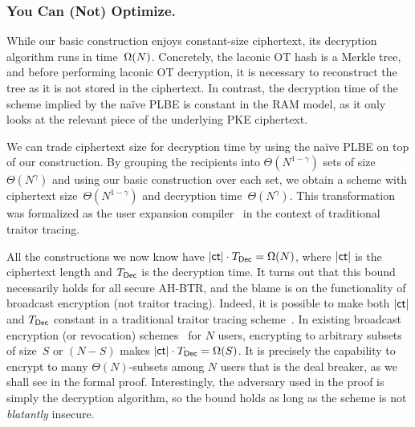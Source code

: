 \subsubsection{You Can (Not) Optimize.}
While our basic construction enjoys constant-size ciphertext,
its decryption algorithm runs in time~$\operatorname{\Omega}(N)$.
Concretely, the laconic OT hash is a Merkle tree, and before performing laconic OT decryption, it is necessary to reconstruct the tree as it is not stored in the ciphertext.
In contrast, the decryption time of the scheme implied by the na{\"i}ve PLBE is constant in the RAM model, as it only looks at the relevant piece of the underlying PKE ciphertext.

We can trade ciphertext size for decryption time by using the na{\"i}ve PLBE on top of our construction.
By grouping the recipients into $\Theta(N^{1-\gamma})$ sets of size~$\Theta(N^\gamma)$ and using our basic construction over each set, we obtain a scheme with ciphertext size~$\Theta(N^{1-\gamma})$ and decryption time~$\Theta(N^\gamma)$.
This transformation was formalized as the user expansion compiler~\cite{C:Zhandry20} in the context of traditional traitor tracing.

All the constructions we now know have ${|\ct|\cdot\TDec=\bigOmega(N)}$,
where $|\ct|$ is the ciphertext length and $\TDec$ is the decryption time.
It turns out that this bound necessarily holds for all secure AH-BTR, and
the blame is on the functionality of broadcast encryption (not traitor tracing).
Indeed, 
it is possible to make both $|\ct|$ and $\TDec$ constant in a traditional traitor tracing scheme~\cite{C:BonZha14}.
In existing broadcast encryption (or revocation) schemes~\cite{C:BonGenWat05,AC:Delerablee07,EC:GenWat09,C:BonZha14,EC:AgrYam20,TCC:AgrWicYam20,EPRINT:BraVai20} for $N$ users,
encrypting to arbitrary subsets of size~$S$ or $({N-S})$ makes ${|\ct|\cdot\TDec=\Omega(S)}$.
It is precisely the capability to encrypt to many $\Theta(N)$-subsets among $N$ users that is the deal breaker, as we shall see in the formal proof.
Interestingly,
the adversary used in the proof is simply the decryption algorithm,
so the bound holds as long as the scheme is not \emph{blatantly} insecure.

